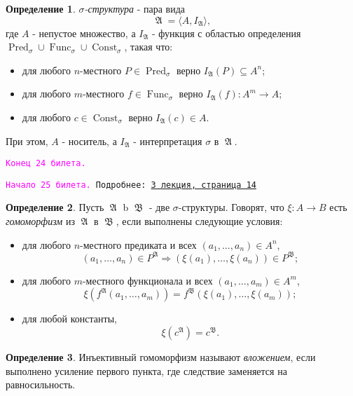 \documentclass[a4paper,100pt]{article}
\theoremstyle{indented}
\theoremstyle{definition}
\newtheorem{defn}{Определение}
\theoremstyle{remark}
\DeclareMathOperator{\ra}{\rightarrow}
\DeclareMathOperator{\Ra}{\Rightarrow}
\DeclareMathOperator{\Pred}{Pred}
\DeclareMathOperator{\Func}{Func}
\DeclareMathOperator{\Const}{Const}
\DeclareMathOperator{\GA}{\mathfrak{A}}
\DeclareMathOperator{\GB}{\mathfrak{B}}
\begin{document}
\begin{defn}
  \textit{$\sigma$-структура} - пара вида 
  \[
    \GA = \langle A, I_{\GA}\rangle, 
  \]
  где $A$ - непустое множество, а $I_{\GA}$ - функция с областью определения $\Pred_\sigma \cup \Func_\sigma \cup \Const_\sigma$, такая что:

  \begin{itemize}
    \item для любого $n$-местного $P\in \Pred_\sigma$ верно $I_{\GA}(P)\subseteq A^n$; 
    \item для любого $m$-местного $f\in \Func_\sigma$ верно $I_{\GA}(f):A^m\ra A$; 
    \item для любого $c\in\Const_\sigma$ верно $I_{\GA}(c)\in A$. 
  \end{itemize}

  При этом, $A$ - носитель, а $I_{\GA}$ - интерпретация $\sigma$ в $\GA$. 
\end{defn}

\texttt{\textcolor{magenta}{Конец 24 билета.}} 

\hrulefill

\texttt{\hypertarget{b25}{\textcolor{magenta}{Начало 25 билета.}} Подробнее: \href{http://www.mi-ras.ru/~speranski/courses/logic-1-2021-spring/slides_3.pdf}{3 лекция, страница 14}} 

\begin{defn}
  Пусть $\GA$ b $\GB$ - две $\sigma$-структуры. Говорят, что $\xi: A\ra B$ есть \textit{гомоморфизм} из $\GA$ в $\GB$, если выполнены следующие условия:

  \begin{itemize}
    \item для любого $n$-местного предиката и всех $(a_1, \ldots, a_n)\in A^n$, 
    \[
      (a_1, \ldots, a_n)\in P^{\GA} \Ra (\xi(a_1), \ldots, \xi(a_n)) \in P^{\GB}; 
    \]
    \item для любого $m$-местного функционала и всех $(a_1, \ldots, a_m)\in A^m$, 
    \[
      \xi(f^{\GA}(a_1, \ldots, a_m))=f^{\GB}(\xi(a_1), \ldots, \xi(a_m)); 
    \]
    \item для любой константы, 
    \[
      \xi(c^{\GA})=c^{\GB}.
    \]
  \end{itemize}
\end{defn}

\begin{defn}
  Инъективный гомоморфизм называют \textit{вложением}, если выполнено усиление первого пункта, где следствие заменяется на равносильность.
\end{defn}
\end{document}
